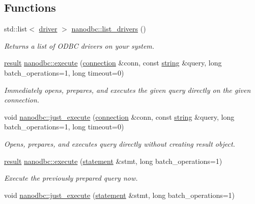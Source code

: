 \subsection*{Functions}
\begin{DoxyCompactItemize}
\item 
std\+::list$<$ \mbox{\hyperlink{structnanodbc_1_1driver}{driver}} $>$ \mbox{\hyperlink{group__mainf_ga6f80fb8f7af3bb099e04bf8d603a210a}{nanodbc\+::list\+\_\+drivers}} ()
\begin{DoxyCompactList}\small\item\em Returns a list of O\+D\+BC drivers on your system. \end{DoxyCompactList}\item 
\mbox{\hyperlink{classnanodbc_1_1result}{result}} \mbox{\hyperlink{group__mainf_ga5cbac617a3964611bd16a2fc6f991b83}{nanodbc\+::execute}} (\mbox{\hyperlink{classnanodbc_1_1connection}{connection}} \&conn, const \mbox{\hyperlink{namespacenanodbc_abfc0ece56278e590911ec8352774c212}{string}} \&query, long batch\+\_\+operations=1, long timeout=0)
\begin{DoxyCompactList}\small\item\em Immediately opens, prepares, and executes the given query directly on the given connection. \end{DoxyCompactList}\item 
void \mbox{\hyperlink{group__mainf_gaee1775943fa1c5906cda9341851633c1}{nanodbc\+::just\+\_\+execute}} (\mbox{\hyperlink{classnanodbc_1_1connection}{connection}} \&conn, const \mbox{\hyperlink{namespacenanodbc_abfc0ece56278e590911ec8352774c212}{string}} \&query, long batch\+\_\+operations=1, long timeout=0)
\begin{DoxyCompactList}\small\item\em Opens, prepares, and executes query directly without creating result object. \end{DoxyCompactList}\item 
\mbox{\hyperlink{classnanodbc_1_1result}{result}} \mbox{\hyperlink{group__mainf_gad178fcf995fa5ac42702607f35e5ba39}{nanodbc\+::execute}} (\mbox{\hyperlink{classnanodbc_1_1statement}{statement}} \&stmt, long batch\+\_\+operations=1)
\begin{DoxyCompactList}\small\item\em Execute the previously prepared query now. \end{DoxyCompactList}\item 
void \mbox{\hyperlink{group__mainf_gafa9051df00f710f9d4123dc24896d821}{nanodbc\+::just\+\_\+execute}} (\mbox{\hyperlink{classnanodbc_1_1statement}{statement}} \&stmt, long batch\+\_\+operations=1)

\end{DoxyCompactItemize}
